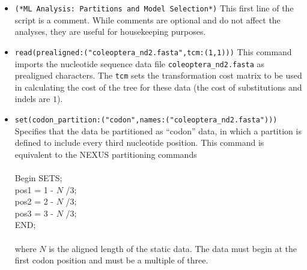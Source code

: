 \begin{itemize}
\item \texttt{(*ML Analysis: Partitions and Model Selection*)} This first line of the script is a comment. 
While comments are optional and do not affect the analyses, they are useful for housekeeping purposes.
\item \texttt{read(prealigned:("coleoptera\_nd2.fasta",tcm:(1,1)))} This command imports the nucleotide sequence 
data file \texttt{coleoptera\_nd2.fasta} as prealigned characters.  The \texttt{tcm} sets the transformation cost matrix 
to be used in calculating the cost of the tree for these data (the cost of substitutions and indels are $1$). 
\item \texttt{set(codon\_partition:("codon",names:("coleoptera\_nd2.fasta")))} Specifies that the data be 
partitioned as ``codon'' data, in which a partition is defined to include every third nucleotide position. 
This command is equivalent to the NEXUS partitioning commands
\\
\\
Begin SETS;\\
pos1 = 1 - $N$ /3;\\
pos2 = 2 - $N$ /3;\\
pos3 = 3 - $N$ /3;\\
END;\\
\\
where $N$ is the aligned length of the static data. The data must begin at the first codon position and must be a multiple
of three.



\end{itemize}
